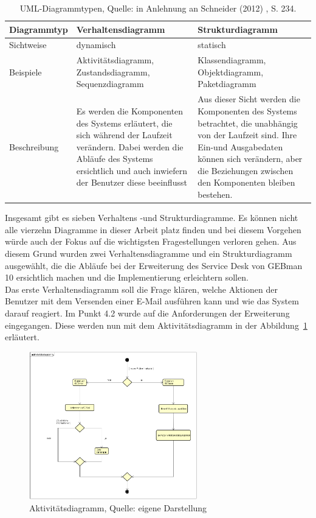 \begin{table}[h!]
    \begin{tabular}{ | p{2.5cm}| p{6cm} | p{6cm} |}
    \hline
    Diagrammtyp & Verhaltensdiagramm & Strukturdiagramm \\ \hline
   Sichtweise & dynamisch & statisch \\ \hline
   Beispiele & Aktivitätsdiagramm, Zustandsdiagramm, Sequenzdiagramm &  Klassendiagramm, 
   Objektdiagramm, Paketdiagramm\\ \hline
   Beschreibung &  Es werden die Komponenten des Systems erläutert, die sich während der Laufzeit 
   verändern. Dabei werden die Abläufe des Systems ersichtlich und auch inwiefern der Benutzer diese 
   beeinflusst & Aus dieser Sicht werden die Komponenten des Systems betrachtet, die unabhängig von 
   der Laufzeit sind. Ihre Ein-und Ausgabedaten können sich verändern, aber die Beziehungen zwischen 
   den Komponenten bleiben bestehen. \\ \hline  
    \end{tabular}
    \caption{UML-Diagrammtypen, Quelle: in Anlehnung an Schneider (2012) , S. 234.}
\end{table}


\noindent
Insgesamt gibt es sieben Verhaltens -und Strukturdiagramme. Es können nicht alle vierzehn Diagramme in dieser Arbeit platz finden und bei diesem Vorgehen würde auch der Fokus auf die wichtigsten Fragestellungen verloren  gehen. Aus diesem Grund wurden zwei Verhaltensdiagramme und ein Strukturdiagramm ausgewählt, die die Abläufe bei der Erweiterung des Service Desk von GEBman 10 ersichtlich machen und die Implementierung erleichtern sollen. \\

\noindent
Das erste Verhaltensdiagramm soll die Frage klären, welche Aktionen der Benutzer mit dem Versenden einer E-Mail ausführen kann und wie das System darauf reagiert. Im Punkt 4.2 wurde auf die Anforderungen der Erweiterung eingegangen. Diese werden nun mit dem Aktivitätsdiagramm  in der Abbildung~\ref{fig:Aktivitaetsdiagramm} erläutert.

\begin{figure}[h!]
\centering
\includegraphics[width=0.65\textwidth]{Abbildungen/Aktivitaetsdiagramm.png}
	\caption[Aktivit{\"a}tsdiagramm]{Aktivit{\"a}tsdiagramm, Quelle: eigene Darstellung}
	\label{fig:Aktivitaetsdiagramm}
\end{figure}

